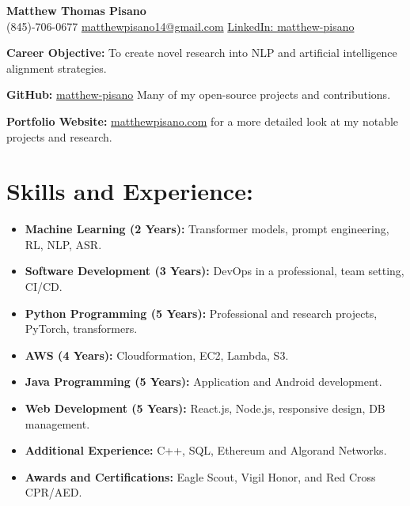 \documentclass[12pt]{article}
\title{}
\author{\textbf{\LARGE Matthew Thomas Pisano}}
\date{}
\begin{document}
\pagestyle{plain}

\begin{tcolorbox}[width=\linewidth, sharp corners=all, colback=white!90!green, colframe=black]
    
    \begin{center}
        \textbf{\LARGE Matthew Thomas Pisano}\\
        \vspace{0.1in}
        (845)-706-0677 \hspace*{0.3in}
        \href{mailto:matthewpisano14@gmail.com}{matthewpisano14@gmail.com} \hspace*{0.5in}
        \href{https://www.linkedin.com/in/matthew-pisano/}{LinkedIn: matthew-pisano}
    \end{center}
    
\end{tcolorbox}

\vspace{0.1in}

\hspace*{-0.3in}
\textbf{Career Objective:} To create novel research into NLP and artificial intelligence alignment strategies.

\vspace{0.1in}

\hspace*{-0.3in}
\textbf{GitHub:} \href{https://github.com/matthew-pisano}{matthew-pisano} Many of my open-source projects and contributions.

\hspace*{-0.3in}
\textbf{Portfolio Website:} \href{https://matthewpisano.com}{matthewpisano.com} for a more detailed look at my notable projects and research.

\section*{Skills and Experience:}
\begin{itemize}
    \itemsep0em
    \item \textbf{Machine Learning (2 Years):} Transformer models, prompt engineering, RL, NLP, ASR.
    \item \textbf{Software Development (3 Years):} DevOps in a professional, team setting, CI/CD. 
    \item \textbf{Python Programming (5 Years):} Professional and research projects, PyTorch, transformers.
    \item \textbf{AWS (4 Years):} Cloudformation, EC2, Lambda, S3.
    \item \textbf{Java Programming (5 Years):} Application and Android development.
    \item \textbf{Web Development (5 Years):} React.js, Node.js, responsive design, DB management.
    \item \textbf{Additional Experience:} C++, SQL, Ethereum and Algorand Networks.
    \item \textbf{Awards and Certifications:} Eagle Scout, Vigil Honor, and Red Cross CPR/AED.
\end{itemize}
\end{document}
